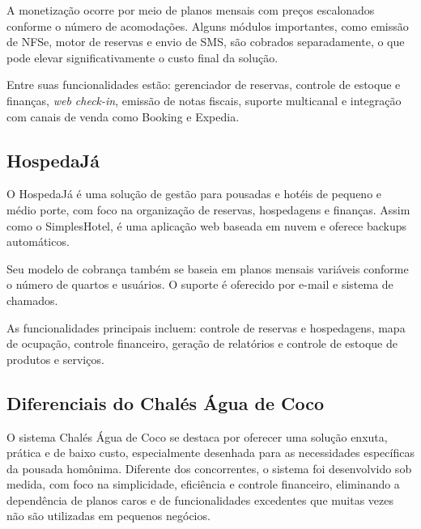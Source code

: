 \documentclass[
	12pt,				%
	openany,			%
	oneside,			%
	a4paper,			%
	english,			%
	french,				%
	spanish,			%
	brazil				%
	]{abntex2}
\begin{document}
A monetização ocorre por meio de planos mensais com preços escalonados conforme o número de acomodações. Alguns módulos importantes, como emissão de NFSe, motor de reservas e envio de SMS, são cobrados separadamente, o que pode elevar significativamente o custo final da solução.

Entre suas funcionalidades estão: gerenciador de reservas, controle de estoque e finanças, \textit{web check-in}, emissão de notas fiscais, suporte multicanal e integração com canais de venda como Booking e Expedia.

\subsection{HospedaJá}
O HospedaJá é uma solução de gestão para pousadas e hotéis de pequeno e médio porte, com foco na organização de reservas, hospedagens e finanças. Assim como o SimplesHotel, é uma aplicação web baseada em nuvem e oferece backups automáticos.

Seu modelo de cobrança também se baseia em planos mensais variáveis conforme o número de quartos e usuários. O suporte é oferecido por e-mail e sistema de chamados.

As funcionalidades principais incluem: controle de reservas e hospedagens, mapa de ocupação, controle financeiro, geração de relatórios e controle de estoque de produtos e serviços.

\subsection{Diferenciais do Chalés Água de Coco}
O sistema Chalés Água de Coco se destaca por oferecer uma solução enxuta, prática e de baixo custo, especialmente desenhada para as necessidades específicas da pousada homônima. Diferente dos concorrentes, o sistema foi desenvolvido sob medida, com foco na simplicidade, eficiência e controle financeiro, eliminando a dependência de planos caros e de funcionalidades excedentes que muitas vezes não são utilizadas em pequenos negócios.
\end{document}

